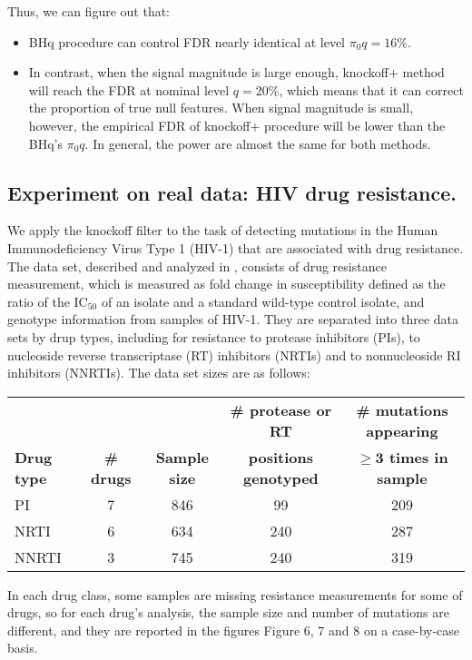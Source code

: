 \documentclass{uwstat572}
\begin{document}
Thus, we can figure out that:
\begin{itemize}
\item BHq procedure can control FDR nearly identical at level $\pi_0 q= 16\%$.
\item In contrast, when the signal magnitude is large enough, knockoff$+$ method will reach the FDR at nominal level $q=20\%$, which means that it can correct the proportion of true null features. When signal magnitude is small, however, the empirical FDR of knockoff$+$ procedure will be lower than the BHq's $\pi_0q$. In general, the power are almost the same for both methods.
\end{itemize}

\subsection{Experiment on real data: HIV drug resistance.}
We apply the knockoff filter to the task of detecting mutations in the Human Immunodeficiency Virus Type 1 (HIV-1) that are associated with drug resistance. The data set, described and analyzed in \cite{rhee2006genotypic}, consists of drug resistance measurement, which is measured as fold change in susceptibility
defined as the ratio of the IC$_{50}$ of an isolate and a standard wild-type
control isolate, and genotype information from samples of HIV-1. They are separated into three data sets by drup types, including for resistance to protease inhibitors (PIs), to nucleoside reverse transcriptase (RT) inhibitors (NRTIs) and to nonnucleoside RI inhibitors (NNRTIs). The data set sizes are as follows:
\begin{table}[!htb]
	\centering
	\begin{tabular}{l|cccc}
		\hline
			&  &  & \textbf{\# protease or RT} & \textbf{\# mutations appearing} \\
		\textbf{Drug type}	& \textbf{\# drugs} & \textbf{Sample size} & \textbf{positions genotyped} & \textbf{$\bm{\geq 3}$ times in sample} \\
		 \hline
		PI & 7 & 846 & 99 & 209\\ 
		NRTI & 6 & 634 & 240 & 287\\
		NNRTI & 3 & 745 & 240 & 319\\\hline
	\end{tabular}
\end{table}

In each drug class, some samples are missing resistance measurements for some of drugs, so for each drug's analysis, the sample size and number of mutations are different, and they are reported in the figures Figure 6, 7 and 8 on a case-by-case basis.
\end{document}
